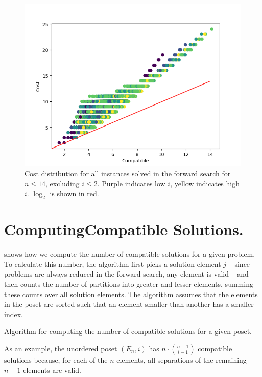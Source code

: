 \documentclass[a4paper,UKenglish,cleveref, autoref, thm-restate]{lipics-v2021}
\begin{document}
\begin{figure}[h]
  \includegraphics*[scale=0.5]{figures/compatible_cost_relation.png}
  \caption*{Cost distribution for all instances solved in the forward search for $n \leq 14$, excluding $i \leq 2$.
    Purple indicates low $i$, yellow indicates high $i$. $\log_2$ is shown in red.}
\end{figure}

\section{ComputingCompatible Solutions.}
 shows how we compute the number of compatible solutions for a given problem.
To calculate this number, the algorithm first picks a solution element $j$ -- since problems are always reduced in the forward search, any element is valid -- and then counts the number of partitions into greater and lesser elements, summing these counts over all solution elements.
The algorithm assumes that the elements in the poset are sorted such that an element smaller than another has a smaller index.

\begin{algorithm}[t]
  \centering
  
  \caption{Algorithm for computing the number of compatible solutions for a given poset.}
  \label{algo:compatible_solutions}
\end{algorithm}

As an example, the unordered poset $(E_n, i)$ has $n \cdot \binom{n - 1}{i - 1}$ compatible solutions because, for each of the $n$ elements, all separations of the remaining $n - 1$ elements are valid.
\end{document}
